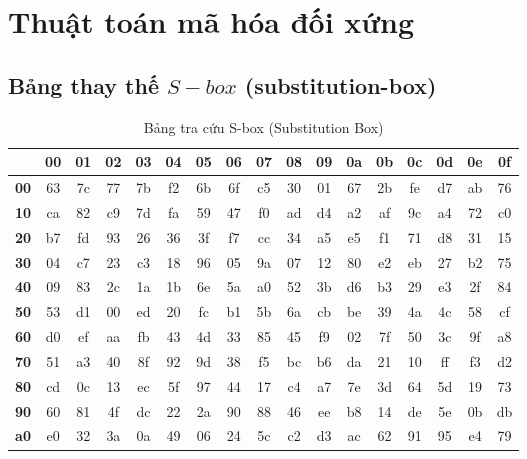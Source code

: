 \appendix

\chapter{Thuật toán mã hóa đối xứng}
\section{Bảng thay thế $S-box$ (substitution-box)}
\begin{table}[h!]
	\centering
	\caption{Bảng tra cứu S-box (Substitution Box)}
	\label{tab:sbox}
	
	\setlength{\tabcolsep}{3pt} %
	\begin{tabular}{|c|c|c|c|c|c|c|c|c|c|c|c|c|c|c|c|c|}
		\hline
		& \textbf{00} & \textbf{01} & \textbf{02} & \textbf{03} & \textbf{04} & \textbf{05} & \textbf{06} & \textbf{07} & \textbf{08} & \textbf{09} & \textbf{0a} & \textbf{0b} & \textbf{0c} & \textbf{0d} & \textbf{0e} & \textbf{0f} \\ \hline
		\textbf{00} & 63 & 7c & 77 & 7b & f2 & 6b & 6f & c5 & 30 & 01 & 67 & 2b & fe & d7 & ab & 76 \\ \hline
		\textbf{10} & ca & 82 & c9 & 7d & fa & 59 & 47 & f0 & ad & d4 & a2 & af & 9c & a4 & 72 & c0 \\ \hline
		\textbf{20} & b7 & fd & 93 & 26 & 36 & 3f & f7 & cc & 34 & a5 & e5 & f1 & 71 & d8 & 31 & 15 \\ \hline
		\textbf{30} & 04 & c7 & 23 & c3 & 18 & 96 & 05 & 9a & 07 & 12 & 80 & e2 & eb & 27 & b2 & 75 \\ \hline
		\textbf{40} & 09 & 83 & 2c & 1a & 1b & 6e & 5a & a0 & 52 & 3b & d6 & b3 & 29 & e3 & 2f & 84 \\ \hline
		\textbf{50} & 53 & d1 & 00 & ed & 20 & fc & b1 & 5b & 6a & cb & be & 39 & 4a & 4c & 58 & cf \\ \hline
		\textbf{60} & d0 & ef & aa & fb & 43 & 4d & 33 & 85 & 45 & f9 & 02 & 7f & 50 & 3c & 9f & a8 \\ \hline
		\textbf{70} & 51 & a3 & 40 & 8f & 92 & 9d & 38 & f5 & bc & b6 & da & 21 & 10 & ff & f3 & d2 \\ \hline
		\textbf{80} & cd & 0c & 13 & ec & 5f & 97 & 44 & 17 & c4 & a7 & 7e & 3d & 64 & 5d & 19 & 73 \\ \hline
		\textbf{90} & 60 & 81 & 4f & dc & 22 & 2a & 90 & 88 & 46 & ee & b8 & 14 & de & 5e & 0b & db \\ \hline
		\textbf{a0} & e0 & 32 & 3a & 0a & 49 & 06 & 24 & 5c & c2 & d3 & ac & 62 & 91 & 95 & e4 & 79 \\ \hline

\end{tabular}
\end{table}
